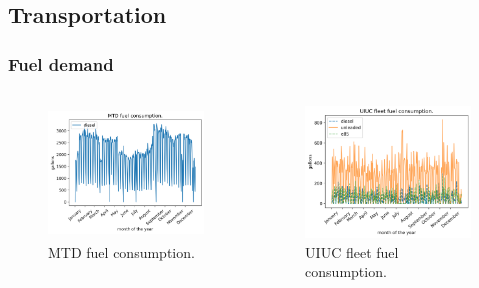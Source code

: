 \subsection{Transportation}
\begin{frame}
\frametitle{Fuel demand}
\begin{columns}
    \column[t]{5cm}
	\begin{figure}[htbp!]
		\begin{center}
			\includegraphics[height=3.5cm]{images/mtd2}
		\end{center}
		\caption{MTD fuel consumption.}
	\end{figure}

	\column[t]{5cm}
	\begin{figure}[htbp!]
		\begin{center}
			\includegraphics[height=3.5cm]{images/uiuc}
		\end{center}
		\caption{UIUC fleet fuel consumption.}
	\end{figure}
\end{columns}
\end{frame}


